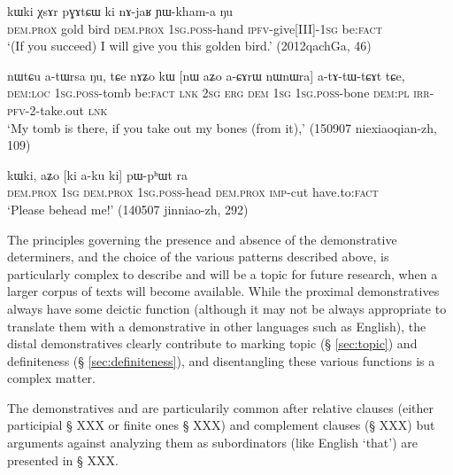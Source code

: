 \begin{exe}
\ex \label{ex:kWki.XsAr.pGAtCW}
 \gll kɯki χsɤr pɣɤtɕɯ ki nɤ-jaʁ ɲɯ-kham-a ŋu \\
\textsc{dem}.\textsc{prox} gold bird \textsc{dem}.\textsc{prox} \textsc{1sg}.\textsc{poss}-hand \textsc{ipfv}-give[III]-\textsc{1sg} be:\textsc{fact} \\
\glt `(If you succeed) I will give you this golden bird.' (2012qachGa, 46)
\end{exe}

\begin{exe}
\ex \label{ex:nW.aZo.aCArW.nW}
 \gll nɯtɕu a-tɯrsa ŋu, tɕe nɤʑo kɯ [nɯ aʑo a-ɕɤrɯ nɯnɯra] a-tɤ-tɯ-tɕɤt tɕe, \\
 \textsc{dem}:\textsc{loc} \textsc{1sg}.\textsc{poss}-tomb be:\textsc{fact} \textsc{lnk} \textsc{2sg} \textsc{erg} \textsc{dem} \textsc{1sg} \textsc{1sg}.\textsc{poss}-bone \textsc{dem}:\textsc{pl} \textsc{irr}-\textsc{pfv}-2-take.out \textsc{lnk} \\
\glt `My tomb is there, if you take out my bones (from it),' (150907 niexiaoqian-zh, 109)
\end{exe}

\begin{exe}
\ex \label{ex:aZo.ki.aku.ki}
 \gll  kɯki, aʑo [ki a-ku ki] pɯ-pʰɯt ra \\
 \textsc{dem}.\textsc{prox} \textsc{1sg}  \textsc{dem}.\textsc{prox} \textsc{1sg}.\textsc{poss}-head  \textsc{dem}.\textsc{prox} \textsc{imp}-cut have.to:\textsc{fact} \\
 \glt `Please behead me!' (140507 jinniao-zh, 292)
\end{exe}

The principles governing the presence and absence of the demonstrative determiners, and the choice of the various patterns described above, is particularly complex to describe and will be a topic for future research, when a larger corpus of texts will become available. While the proximal demonstratives always have some deictic function (although it may not be always appropriate to translate them with a demonstrative in other languages such as English), the distal demonstratives clearly contribute to marking topic (§ \ref{sec:topic}) and definiteness (§ \ref{sec:definiteness}), and disentangling these various functions is a complex matter.

The demonstratives  and  are particularily common after relative clauses (either participial § XXX or finite ones § XXX) and complement clauses (§ XXX) but arguments against analyzing them as subordinators (like English `that') are presented in § XXX. 

